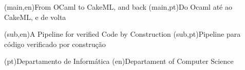 
%




%
%
%
%
\nttitle(main,en){From OCaml to CakeML, and back}%
\nttitle(main,pt){Do Ocaml até ao CakeML, e de volta}%

\nttitle(sub,en){A Pipeline for verified Code by Construction}%
\nttitle(sub,pt){Pipeline para código verificado por construção}%



%
%
%
%
\ntdepartment*(pt){Departamento de Informática}
\ntdepartment*(en){Departament of Computer Science}




